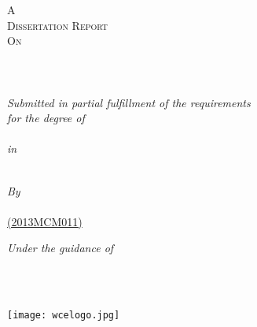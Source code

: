 
\begin{titlepage}
\begin{center}
\textsc{\LARGE A\\Dissertation Report\\[0.2cm]On}\\[0.2cm] %

\HRule \\[0.1cm] %
\vspace{0.5cm}
{\huge \bfseries \ttitle}\\[0.3cm] %
\HRule \\[0.5cm] %

\large{\textit{Submitted in partial fulfillment of the requirements\\ for the degree of}}\\[0.4cm] \textbf{\Large{\textit{\degreename}}}\\

\large{\textit{in}}\\
\textbf{\Large{\textit{\deptname}}}\\[0.5cm]



 \begin{minipage}{0.4\textwidth}
\begin{center} \large
\emph{By}\\[0.3cm]
\href{http://ravindramn.blogspot.in}{\authornames\\ %
(2013MCM011)}
\end{center}
\end{minipage}

\vspace{0.5cm}

\begin{minipage}{0.4\textwidth}
\begin{center} \large
\emph{Under the guidance of} \\ 
{\supname\\ } %
\end{center}
\end{minipage}\\[1cm]

 \begin{minipage}{\textwidth}
\centering
	 \texttt{[image: wcelogo.jpg]}
\end{minipage}\\[1cm]



\end{center}
\end{titlepage}

